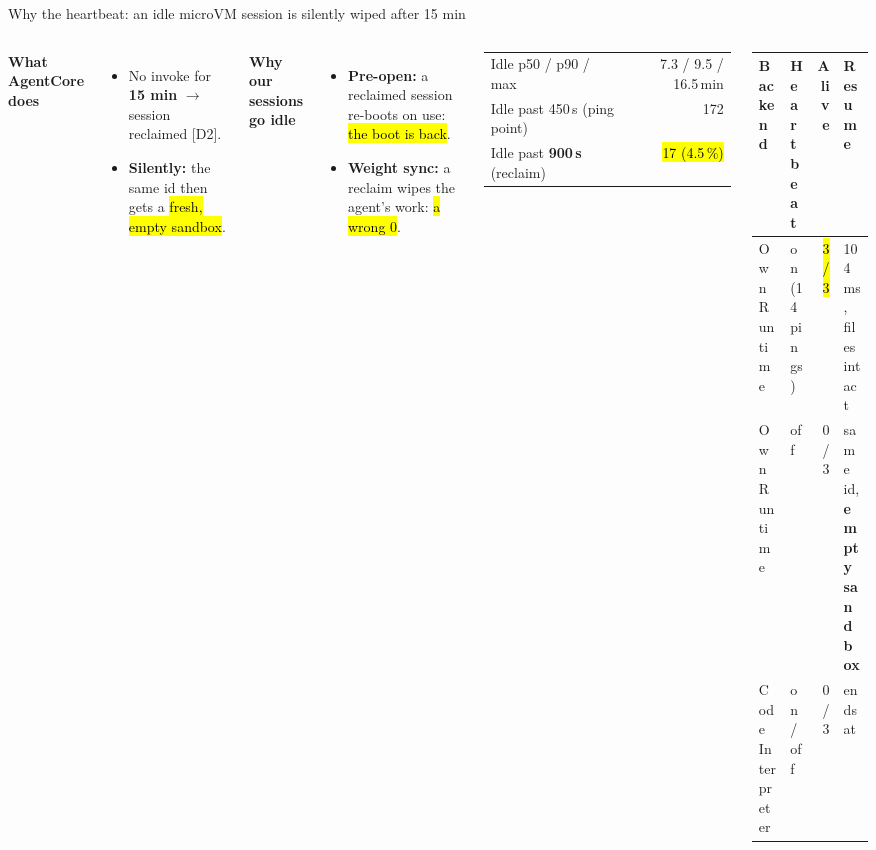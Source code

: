 \begin{frame}{Why the heartbeat: an idle microVM session is silently wiped after 15 min}
\begin{columns}[T]
\textbf{\footnotesize What AgentCore does}
\begin{itemize}\scriptsize\setlength{\itemsep}{0.8mm}
\item No invoke for \textbf{15 min} $\rightarrow$ session reclaimed [D2].
\item \textbf{Silently:} the same id then gets a \hl{fresh, empty sandbox}.
\end{itemize}
\textbf{\footnotesize Why our sessions go idle}
\begin{itemize}\scriptsize\setlength{\itemsep}{0.8mm}
\item \textbf{Pre-open:} a reclaimed session re-boots on use: \hl{the boot is back}.
\item \textbf{Weight sync:} a reclaim wipes the agent's work: \hl{a wrong 0}.
\end{itemize}
\scriptsize
\begin{tabularx}{\linewidth}{@{}Yr@{}}
\toprule
Idle p50 / p90 / max & 7.3 / 9.5 / 16.5\,min\\
Idle past 450\,s (ping point) & 172\\
Idle past \textbf{900\,s} (reclaim) & \hl{17 (4.5\,\%)}\\
\bottomrule
\end{tabularx}
\par\vspace{2mm}
\tiny\setlength{\tabcolsep}{3pt}
\begin{tabularx}{\linewidth}{@{}P{0.27\linewidth}P{0.2\linewidth}rY@{}}
\toprule
\textbf{Backend} & \textbf{Heartbeat} & \textbf{Alive} & \textbf{Resume}\\
\midrule
Own Runtime & on (14 pings) & \hl{3 / 3} & 104 ms, files intact\\
Own Runtime & off & 0 / 3 & same id, \textbf{empty sandbox}\\
Code Interpreter & on / off & 0 / 3 & ends at \\
\bottomrule
\end{tabularx}
\end{columns}
\end{frame}


